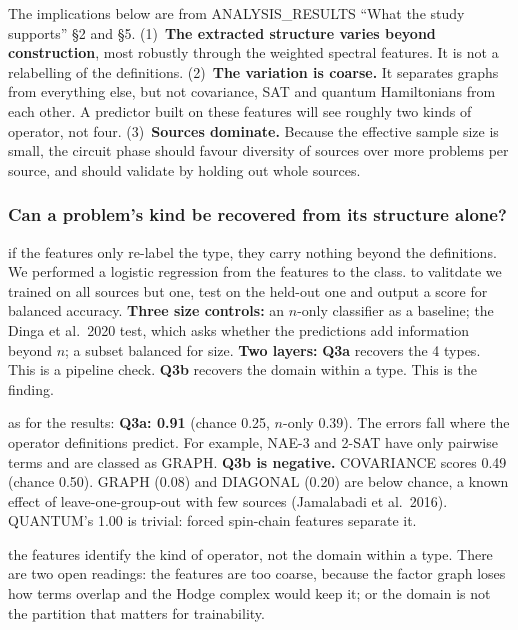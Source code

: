 \documentclass[10pt,a4paper]{article}
\begin{document}
The implications below are from ANALYSIS\_RESULTS ``What the study supports''
\S2 and \S5.
(1)~\textbf{The extracted structure varies beyond construction}, most
robustly through the weighted spectral features. It is not a relabelling of
the definitions.
(2)~\textbf{The variation is coarse.} It separates graphs from
everything else, but not covariance, SAT and quantum Hamiltonians from each
other. A predictor built on these features will see roughly two kinds of
operator, not four.
(3)~\textbf{Sources dominate.} Because the effective sample size is
small, the circuit phase should favour diversity of sources over more
problems per source, and should validate by holding out whole sources.

\subsubsection{Can a problem's kind be recovered from its structure alone?}

if the features only re-label the type, they carry nothing beyond the
definitions. We performed a logistic regression from the features to the
class. to valitdate we trained on all sources but one, test on the held-out
one and output a score for balanced accuracy.
\textbf{Three size controls:}
an $n$-only classifier as a baseline;
the Dinga et al.\ 2020 test, which asks whether the predictions add
information beyond $n$;
a subset balanced for size.
\textbf{Two layers:}
\textbf{Q3a} recovers the 4 types. This is a pipeline check.
\textbf{Q3b} recovers the domain within a type. This is the
finding.

as for the results:
\textbf{Q3a: 0.91} (chance 0.25, $n$-only 0.39). The errors fall
where the operator definitions predict. For example, NAE-3 and 2-SAT have
only pairwise terms and are classed as GRAPH.
\textbf{Q3b is negative.} COVARIANCE scores 0.49 (chance 0.50).
GRAPH (0.08) and DIAGONAL (0.20) are below chance, a known effect of
leave-one-group-out with few sources (Jamalabadi et al.\ 2016). QUANTUM's
1.00 is trivial: forced spin-chain features separate it.

the features identify the kind of operator, not the domain within a type.
There are two open readings:
the features are too coarse, because the factor graph loses how terms
overlap and the Hodge complex would keep it;
or the domain is not the partition that matters for trainability.

\end{document}
